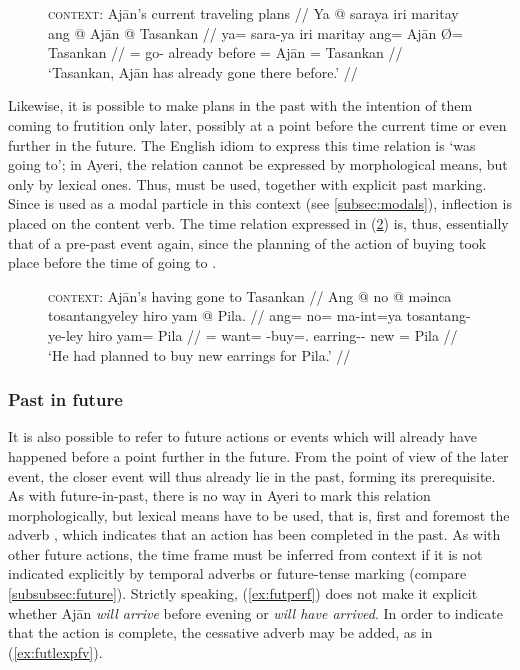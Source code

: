 \begin{figure}[h]
\ex\label{ex:nopstmkr}
\begingl
	\glpreamble \textsc{context:} Ajān's current traveling plans //
	\gla Ya @ saraya iri maritay ang @ Ajān {} @ Tasankan //
	\glb ya= sara-ya iri maritay ang= Ajān Ø= Tasankan //
	\glc \LocT{}= go-\TsgM{} already before \Aarg{}= Ajān \Top{}= %
		Tasankan //
	\glft `Tasankan, Ajān has already gone there before.' //
\endgl
\xe
\end{figure}

Likewise, it is possible to make plans in the past with the intention of them
coming to frutition only later, possibly at a point before the current time or
even further in the future. The English idiom to express this time relation is
`was going to'; in Ayeri, the relation cannot be expressed by morphological
means, but only by lexical ones. Thus,  must be
used, together with explicit past marking. Since  is used as a modal
particle in this context (see \autoref{subsec:modals}), inflection is placed on the content
verb. The time relation expressed in (\ref{ex:pstplan}) is, thus, essentially
that of a pre-past event again, since the planning of the action of buying took
place before the time of going to .

\begin{figure}[h]
\ex\label{ex:pstplan}
\begingl
	\glpreamble \textsc{context}: Ajān's having gone to Tasankan //
	\gla Ang @ no @ məinca tosantangyeley hiro yam @ Pila. //
	\glb ang= no= ma-int=ya tosantang-ye-ley hiro yam= Pila //
	\glc \AgtT{}= want= \Pst{}-buy=\TsgM{}.\Top{} earring-\Pl{}-\PargI{} new 
		\Dat{}= Pila //
	\glft `He had planned to buy new earrings for Pila.' //
\endgl
\xe
\end{figure}


\subsubsection{Past in future}

It is also possible to refer to future actions or events which will already
have happened before a point further in the future. From the point of view of
the later event, the closer event will thus already lie in the past, forming
its prerequisite. As with future-in-past, there is no way in Ayeri to mark this
relation morphologically, but lexical means have to be used, that is, first and
foremost the adverb , which indicates that an action
has been completed in the past. As with other future actions, the time frame
must be inferred from context if it is not indicated explicitly by temporal
adverbs or future-tense marking (compare \autoref{subsubsec:future}). Strictly
speaking, (\ref{ex:futperf}) does not make it explicit whether Ajān \emph{will
arrive} before evening or \emph{will have arrived}. In order to indicate that
the action is complete, the cessative adverb
 may be added, as in (\ref{ex:futlexpfv}).

